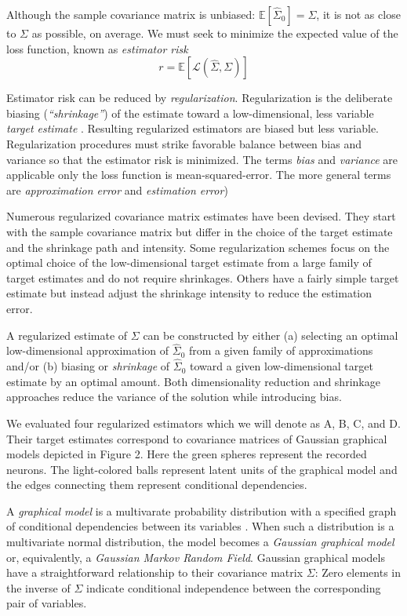 Although the sample covariance matrix is unbiased: $\mathbb E[\hat\Sigma_0]=\Sigma$, it is not as close to $\Sigma$ as possible, on average. We must seek  to minimize the expected value of the loss function, known as \emph{estimator risk} 
\begin{equation}
r = \mathbb E[\mathcal L(\hat\Sigma, \Sigma)]
\end{equation}

Estimator risk can be reduced by \emph{regularization}. Regularization is the deliberate biasing (\emph{``shrinkage''}) of the estimate toward a low-dimensional, less variable \emph{target estimate} \cite{Bickel:2006,Ledoit:2004}.  Resulting regularized estimators are biased but  less variable. Regularization procedures must strike favorable balance between bias and variance so that the estimator risk is minimized. The terms \emph{bias} and \emph{variance} are applicable only the loss function is mean-squared-error. The more general terms are \emph{approximation error} and \emph{estimation error})

Numerous regularized covariance matrix estimates have been devised. They start with the sample covariance matrix but differ in the choice of the target estimate and the shrinkage path and intensity. Some regularization schemes focus on the optimal choice of the low-dimensional target estimate from a large family of target estimates and do not require shrinkages.  Others have a fairly simple target estimate but instead adjust the shrinkage intensity to reduce the estimation error.

A regularized estimate of $\Sigma$ can be constructed by either (a) selecting an optimal low-dimensional approximation of $\hat\Sigma_0$ from a given family of approximations and/or (b) biasing or \emph{shrinkage} of $\hat\Sigma_0$ toward a given low-dimensional target estimate by an optimal amount.  Both dimensionality reduction and shrinkage approaches reduce the variance of the solution while introducing bias. 


We evaluated four regularized estimators which we will denote as A, B, C, and D.  Their target estimates correspond to covariance matrices of Gaussian graphical models depicted in Figure 2.  Here the green spheres represent the recorded neurons. The light-colored balls represent latent units of the graphical model and the edges connecting them represent conditional dependencies.



A \emph{graphical model} is a multivarate probability distribution with a specified graph of conditional dependencies between its variables \cite{Koller:2009}.  When such a distribution is a multivariate normal distribution, the model becomes a \emph{Gaussian graphical model} or, equivalently, a \emph{Gaussian Markov Random Field}.  Gaussian graphical models have a straightforward relationship to their covariance matrix $\Sigma$:  Zero elements in the inverse of $\Sigma$ indicate conditional independence between the corresponding pair of variables.  

